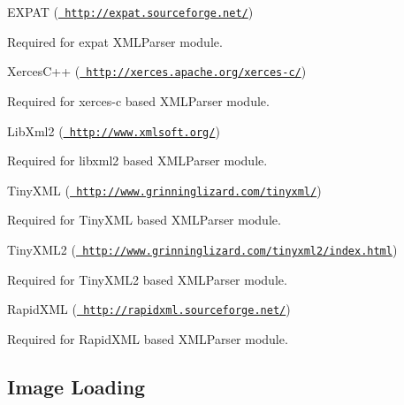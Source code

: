 \begin{DoxyItemize}
\item E\+X\+P\+AT (\href{http://expat.sourceforge.net/}{\texttt{ http\+://expat.\+sourceforge.\+net/}})
\begin{DoxyItemize}
\item Required for expat X\+M\+L\+Parser module.
\end{DoxyItemize}
\item Xerces\+C++ (\href{http://xerces.apache.org/xerces-c/}{\texttt{ http\+://xerces.\+apache.\+org/xerces-\/c/}})
\begin{DoxyItemize}
\item Required for xerces-\/c based X\+M\+L\+Parser module.
\end{DoxyItemize}
\item Lib\+Xml2 (\href{http://www.xmlsoft.org/}{\texttt{ http\+://www.\+xmlsoft.\+org/}})
\begin{DoxyItemize}
\item Required for libxml2 based X\+M\+L\+Parser module.
\end{DoxyItemize}
\item Tiny\+X\+ML (\href{http://www.grinninglizard.com/tinyxml/}{\texttt{ http\+://www.\+grinninglizard.\+com/tinyxml/}})
\begin{DoxyItemize}
\item Required for Tiny\+X\+ML based X\+M\+L\+Parser module.
\end{DoxyItemize}
\item Tiny\+X\+M\+L2 (\href{http://www.grinninglizard.com/tinyxml2/index.html}{\texttt{ http\+://www.\+grinninglizard.\+com/tinyxml2/index.\+html}})
\begin{DoxyItemize}
\item Required for Tiny\+X\+M\+L2 based X\+M\+L\+Parser module.
\end{DoxyItemize}
\item Rapid\+X\+ML (\href{http://rapidxml.sourceforge.net/}{\texttt{ http\+://rapidxml.\+sourceforge.\+net/}})
\begin{DoxyItemize}
\item Required for Rapid\+X\+ML based X\+M\+L\+Parser module.
\end{DoxyItemize}
\end{DoxyItemize}\hypertarget{dependencies_dependencies_codecs}{}\subsection{Image Loading}\label{dependencies_dependencies_codecs}

